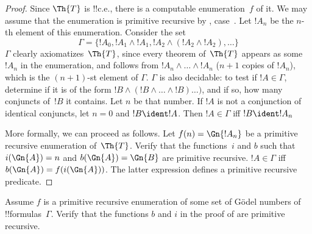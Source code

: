 \documentclass[../../../include/open-logic-section]{subfiles}
\begin{document}
\begin{proof}
  Since $\Th{T}$ is !!{c.e.}, there is a computable enumeration~$f$ of
  it. We may assume that the enumeration is primitive recursive by
  ,
  case~. Let $!A_n$ be the $n$-th
  element of this enumeration. Consider the
  set
  \[
  \Gamma = \{!A_0, !A_1 \land !A_1, !A_2 \land (!A_2 \land !A_2), \dots\}
  \]
  $\Gamma$ clearly axiomatizes~$\Th{T}$, since every theorem
  of~$\Th{T}$ appears as some $!A_n$ in the enumeration, and follows
  from $!A_n \land \dots \land !A_n$ ($n+1$ copies of $!A_n$), which
  is the $(n+1)$-st element of $\Gamma$. $\Gamma$ is also decidable: to
  test if $!A \in \Gamma$, determine if it is of the form $!B \land
  (!B \land \dots \land !B)\dots)$, and if so, how many conjuncts
  of~$!B$ it contains. Let $n$ be that number. If $!A$ is not a
  conjunction of identical conjuncts, let $n=0$ and $!B \ident !A$.
  Then $!A \in \Gamma$ iff $!B \ident !A_{n}$

  More formally, we can proceed as follows. Let  $f(n) = \Gn{!A_n}$ be
  a primitive recursive enumeration of~$\Th{T}$. Verify that the
  functions~$i$ and $b$ such that $i(\Gn{A}) = n$ and $b(\Gn{A}) =
  \Gn{B}$ are primitive recursive.  $!A \in \Gamma$ iff $b(\Gn{A}) =
  f(i(\Gn{A}))$. The latter expression defines a primitive recursive
  predicate.
\end{proof}

\begin{prob}
  Assume $f$ is a primitive recursive enumeration of some set of
  G\"odel numbers of !!{formula}s~$\Gamma$. Verify that the functions $b$
  and $i$ in the proof of  are primitive recursive.
\end{prob}
\end{document}
